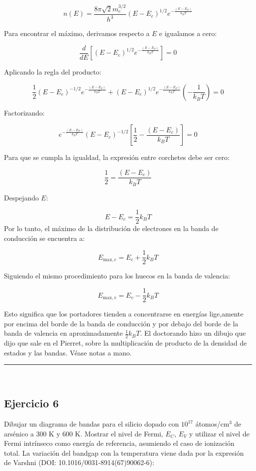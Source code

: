 \begin{enumerate}[label=\alph*)]
		  \[
			  n(E) = \frac{8\pi \sqrt{2} m_c^{3/2}}{h^3} (E - E_c)^{1/2} e^{-\frac{(E - E_F)}{k_B T}}
		  \]

		  Para encontrar el máximo, derivamos respecto a \( E \) e igualamos a cero:

		  \[
			  \frac{d}{dE} \left[ (E - E_c)^{1/2} e^{-\frac{(E - E_F)}{k_B T}} \right] = 0
		  \]

		  Aplicando la regla del producto:

		  \[
			  \frac{1}{2} (E - E_c)^{-1/2} e^{-\frac{(E - E_F)}{k_B T}} + (E - E_c)^{1/2} e^{-\frac{(E - E_F)}{k_B T}} \left(-\frac{1}{k_B T} \right) = 0
		  \]

		  Factorizando:

		  \[
			  e^{-\frac{(E - E_F)}{k_B T}} (E - E_c)^{-1/2} \left[ \frac{1}{2} - \frac{(E - E_c)}{k_B T} \right] = 0
		  \]

		  Para que se cumpla la igualdad, la expresión entre corchetes debe ser cero:

		  \[
			  \frac{1}{2} = \frac{(E - E_c)}{k_B T}
		  \]

		  Despejando \( E \):

		  \[
			  E - E_c = \frac{1}{2} k_B T
		  \]
		  Por lo tanto, el máximo de la distribución de electrones en la banda de conducción se encuentra a:

		  \[
			  E_{\text{max}, c} = E_c + \frac{1}{2} k_B T
		  \]

		  Siguiendo el mismo procedimiento para los huecos en la banda de valencia:

		  \[
			  E_{\text{max}, v} = E_v - \frac{1}{2} k_B T
		  \]

		  Esto significa que los portadores tienden a concentrarse en energías lige,amente por encima del borde de la banda de conducción y por debajo del borde de la banda de valencia en aproximadamente \( \frac{1}{2} k_B T \). El doctorando hizo un dibujo que dijo que sale en el Pierret, sobre la multiplicación de producto de la densidad de estados y las bandas. Véase notas a mano.

\end{enumerate}


\rule{\textwidth}{0.1pt} \\[2pt]

\subsection{Ejercicio 6}

Dibujar un diagrama de bandas para el silicio dopado con $10^{17}$ átomos/cm$^3$ de arsénico a 300 K y 600 K. Mostrar el nivel de Fermi, $E_C$, $E_V$ y utilizar el nivel de Fermi intrínseco como energía de referencia, asumiendo el caso de ionización total. La variación del bandgap con la temperatura viene dada por la expresión de Varshni (DOI: 10.1016/0031-8914(67)90062-6):

